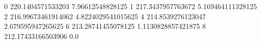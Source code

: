 0 220.1404571533203 7.96612548828125
1 217.3437957763672 5.169464111328125
2 216.99673461914062 4.8224029541015625
4 214.8539276123047 2.679595947265625
6 213.28741455078125 1.1130828857421875
8 212.17433166503906 0.0
